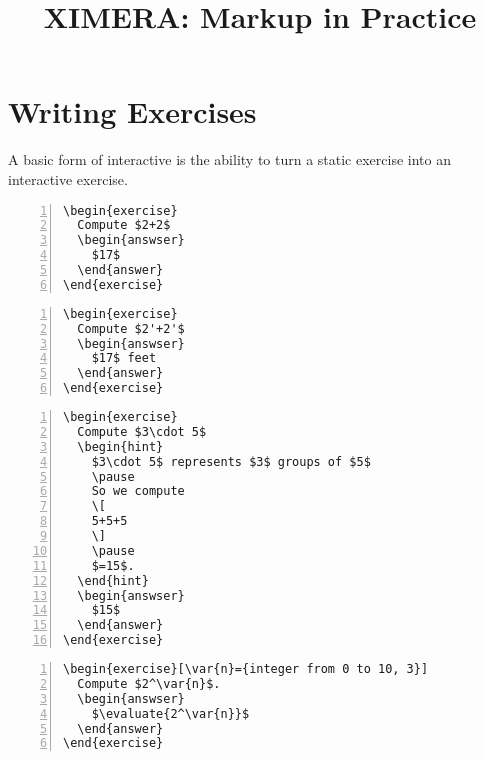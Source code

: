 \documentclass{amsart}
\begin{document}
\title{XIMERA: Markup in Practice} %
\maketitle

\section{Writing Exercises}

A basic form of interactive is the ability to turn a static exercise
into an interactive exercise.

\begin{Verbatim}[frame=single,numbers=left]
\begin{exercise}
  Compute $2+2$
  \begin{answser}
    $17$
  \end{answer}
\end{exercise}
\end{Verbatim}

\begin{Verbatim}[frame=single,numbers=left]
\begin{exercise}
  Compute $2'+2'$
  \begin{answser}
    $17$ feet
  \end{answer}
\end{exercise}
\end{Verbatim}


\begin{Verbatim}[frame=single,numbers=left]
\begin{exercise}
  Compute $3\cdot 5$
  \begin{hint}
    $3\cdot 5$ represents $3$ groups of $5$
    \pause
    So we compute
    \[
    5+5+5
    \]
    \pause
    $=15$. 
  \end{hint}
  \begin{answser}
    $15$
  \end{answer}
\end{exercise}
\end{Verbatim}


\begin{Verbatim}[frame=single,numbers=left]
\begin{exercise}[\var{n}={integer from 0 to 10, 3}]
  Compute $2^\var{n}$.
  \begin{answser}
    $\evaluate{2^\var{n}}$ 
  \end{answer}
\end{exercise}
\end{Verbatim}
\end{document}
